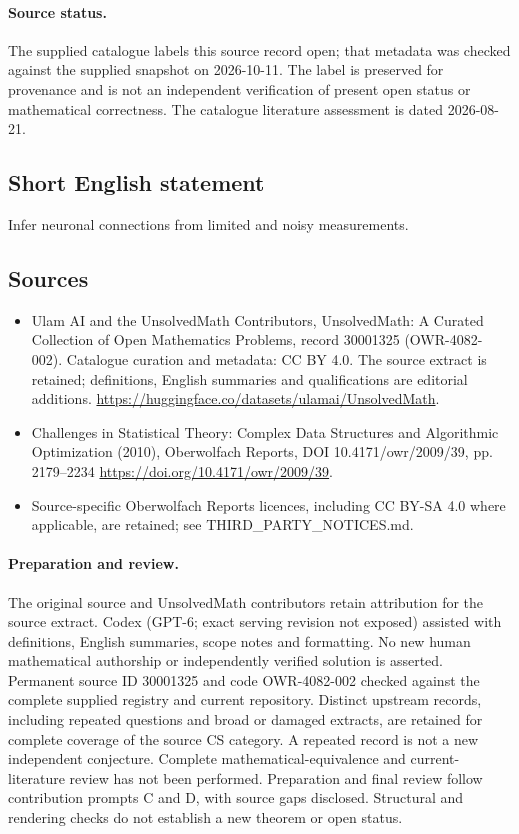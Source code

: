 \documentclass[11pt]{article}
\begin{document}
\paragraph{Source status.}
The supplied catalogue labels this source record open; that metadata was checked against the supplied snapshot on 2026-10-11. The label is preserved for provenance and is not an independent verification of present open status or mathematical correctness. The catalogue literature assessment is dated 2026-08-21.
\subsection{Short English statement}
Infer neuronal connections from limited and noisy measurements.
\subsection{Sources}
\begin{itemize}
\item[S1] Ulam AI and the UnsolvedMath Contributors, UnsolvedMath: A Curated Collection of Open Mathematics Problems, record 30001325 (OWR-4082-002). Catalogue curation and metadata: CC BY 4.0. The source extract is retained; definitions, English summaries and qualifications are editorial additions.
\url{https://huggingface.co/datasets/ulamai/UnsolvedMath}.
\item[S2] Challenges in Statistical Theory: Complex Data Structures and Algorithmic Optimization (2010), Oberwolfach Reports, DOI 10.4171/owr/2009/39, pp. 2179--2234
\url{https://doi.org/10.4171/owr/2009/39}.
\item Source-specific Oberwolfach Reports licences, including CC BY-SA 4.0 where applicable, are retained; see THIRD\_PARTY\_NOTICES.md.
\end{itemize}
\paragraph{Preparation and review.}
The original source and UnsolvedMath contributors retain attribution for the source extract. Codex (GPT-6; exact serving revision not exposed) assisted with definitions, English summaries, scope notes and formatting. No new human mathematical authorship or independently verified solution is asserted. Permanent source ID 30001325 and code OWR-4082-002 checked against the complete supplied registry and current repository. Distinct upstream records, including repeated questions and broad or damaged extracts, are retained for complete coverage of the source CS category. A repeated record is not a new independent conjecture. Complete mathematical-equivalence and current-literature review has not been performed. Preparation and final review follow contribution prompts C and D, with source gaps disclosed. Structural and rendering checks do not establish a new theorem or open status.
\label{end:30001325}
\end{document}
